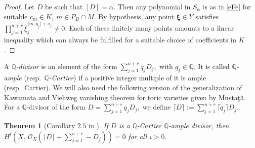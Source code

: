 \documentclass[a4paper,11pt]{amsart}
\newcommand{\Q}{\mathbb{Q}}
\newcommand{\cO}{{\mathcal O}}
\newcommand{\bfxi}{{\boldsymbol{\xi}}}
\newcounter{thm}
\numberwithin{thm}{section}
\numberwithin{equation}{section}
\theoremstyle{definition}
\theoremstyle{plain}
\newtheorem{theorem}[thm]{Theorem}
\begin{document}
\begin{proof}
Let $D$ be such that $[D]=\alpha.$ Then any polynomial in $S_\alpha$ is as in \eqref{eFe} for suitable $c_m\in K,\ m\in P_D\cap M.$
By hypothesis, any point $\bfxi\in Y$ satisfies $\prod_{j=1}^{n+r}\xi_j^{\langle m,\eta_j\rangle+a_j}\neq0.$ Each of these finitely many points amounts to a linear inequality which can always be fulfilled for a suitable choice of coefficients in $K$.
\end{proof}

A {\em $\Q$-divisor}  is an element
of the form $\sum_{j=1}^{n+r} q_j D_j,$ with $q_j\in\Q.$  It is called {\em $\Q$-ample} (resp.~{\em $\Q$-Cartier}) if a positive integer multiple of it is ample (resp.~Cartier).
We will also need the following version of the generalization of Kawamata and Viehweg vanishing theorem for toric varieties given by Musta\c{t}\u{a}. For a $\Q$-divisor of the form $D=\sum_{j=1}^{n+r}q_jD_j,$ we define
$\lceil D\rceil:=\sum_{j=1}^{n+r}\lceil q_j\rceil D_j.$

\begin{theorem}[Corollary $2.5$ in \cite{mus02}]\label{mustata}
If $D$ is a $\Q$-Cartier $\Q$-ample divisor,  then  $H^i(X,\,\cO_{X}(\lceil D\rceil+\sum_{j=1}^{n+r}-D_j))=0$ for all $i>0.$
\end{theorem}




\medskip
\end{document}
